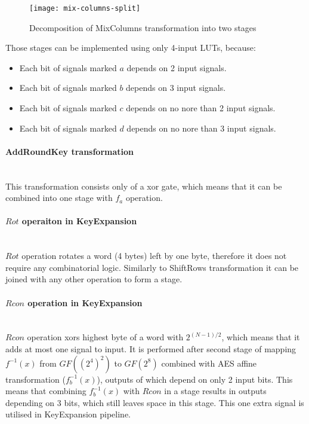 \begin{figure}[!h]
\centering
\texttt{[image: mix-columns-split]}
\caption{Decomposition of MixColumns transformation into two stages}
\label{fig:mix-columns-split}
\end{figure}

Those stages can be implemented using only 4-input LUTs, because:
\begin{itemize}[nolistsep]
\item Each bit of signals marked $a$ depends on 2 input signals.
\item Each bit of signals marked $b$ depends on 3 input signals.
\item Each bit of signals marked $c$ depends on no nore than 2 input signals.
\item Each bit of signals marked $d$ depends on no nore than 3 input signals.
\end{itemize}



\paragraph{AddRoundKey transformation}\mbox{}\\
This transformation consists only of a xor gate, which means that it can be combined into one stage with $f_a$ operation.


\paragraph{$Rot$ operaiton in KeyExpansion}\mbox{}\\
$Rot$ operation rotates a word (4 bytes) left by one byte, therefore it does not require any combinatorial logic. Similarly to ShiftRows transformation it can be joined with any other operation to form a stage.

\paragraph{$Rcon$ operation in KeyExpansion}\mbox{}\\
$Rcon$ operation xors highest byte of a word with $2^{(N - 1)/2}$, which means that it adds at most one signal to input. It is performed after second stage of mapping $f^{-1}(x)$ from $GF((2^4)^2)$ to $GF(2^8)$ combined with AES affine transformation ($f_b^{-1}(x)$), outputs of which depend on only 2 input bits. This means that combining $f_b^{-1}(x)$ with $Rcon$ in a stage results in outputs depending on 3 bits, which still leaves space in this stage. This one extra signal is utilised in KeyExpansion pipeline.

